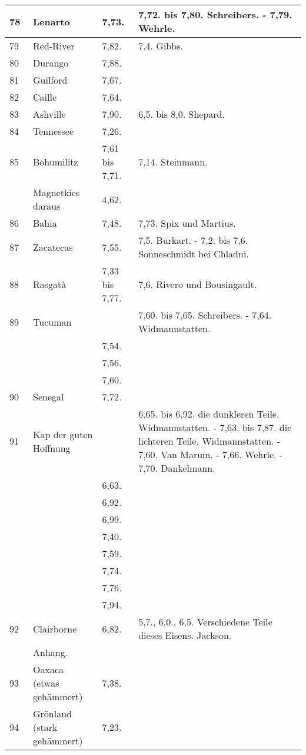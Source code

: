 \documentclass[a4paper, 11pt, oneside, polutonikogreek, german]{article}
\begin{document}
\begin{center}
\begin{longtable}{|p{7mm}|p{32mm}|p{30mm}|p{30mm}|}
        78 & Lenarto & 7,73. & 7,72. bis 7,80. Schreibers. - 7,79. Wehrle. \\ \hline
        79 & Red-River & 7,82. & 7,4. Gibbs. \\ \hline
        80 & Durango & 7,88. & ~ \\ \hline
        81 & Guilford & 7,67. &  ~ \\ \hline
        82 & Caille & 7,64. & ~  \\ \hline
        83 & Ashville & 7,90. & 6,5. bis 8,0. Shepard. \\ \hline
        84 & Tennessee & 7,26. & ~  \\ \hline
        85 & Bohumilitz & 7,61 bis 7,71. & 7,14. Steinmann. \\ \hline
          & Magnetkies daraus & 4,62. & ~  \\ \hline
        86 & Bahia & 7,48. & 7,73. Spix und Martius. \\ \hline
        87 & Zacatecas & 7,55. & 7,5. Burkart. - 7,2. bis 7,6. Sonneschmidt bei Chladni. \\ \hline
        88 & Rasgatà & 7,33 bis 7,77. & 7,6. Rivero und Bousingault. \\ \hline
        89 & Tucuman &   & 7,60. bis 7,65. Schreibers. - 7,64. Widmannstatten. \\ \hline
         ~ &  ~ & 7,54. & ~  \\ \hline
         ~ & ~  & 7,56. & ~  \\ \hline
         ~ & ~  & 7,60. & ~  \\ \hline
        90 & Senegal & 7,72. &   \\ \hline
        91 & Kap der guten Hoffnung & ~ & 6,65. bis 6,92. die dunkleren Teile. Widmannstatten. - 7,63. bis 7,87. die lichteren Teile. Widmannstatten. - 7,60. Van Marum. - 7,66. Wehrle. - 7,70. Dankelmann. \\ \hline
         ~ &  ~ & 6,63. &  ~ \\ \hline
         ~~ & ~  & 6,92. & ~  \\ \hline
         ~ & ~  & 6,99. & ~  \\ \hline
         ~ & ~  & 7,40. & ~  \\ \hline
         ~ & ~  & 7,59. & ~  \\ \hline
        ~  & ~  & 7,74. & ~  \\ \hline
         ~ & ~  & 7,76. & ~  \\ \hline
       ~   & ~  & 7,94. & ~  \\ \hline
        92 & Clairborne & 6,82. & 5,7., 6,0., 6,5. Verschiedene Teile dieses Eisens. Jackson. \\ \hline
         ~ & Anhang. &  ~ &  ~ \\ \hline
        93 & Oaxaca (etwas gehämmert) & 7,38. &   \\ \hline
        94 & Grönland (stark gehämmert) & 7,23. & \\ \hline
    \end{longtable}
\end{center}
\clearpage
\end{document}
